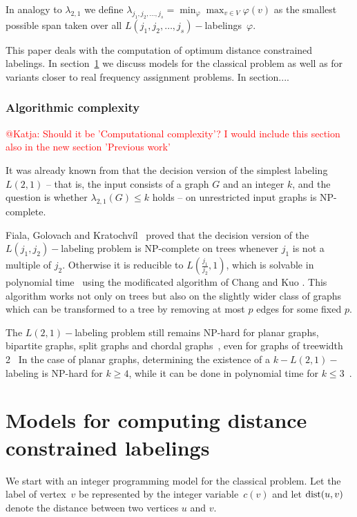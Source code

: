 \documentclass[smallextended]{svjour3}
\def\dist{\mathop{\rm dist}}
\newcommand\ToDo[1]{\textcolor{red}{#1}}
\begin{document}
In analogy to $\lambda_{2,1}$ we define $\lambda_{j_1,j_2,\ldots ,j_{s}}=\min_{\varphi}\max_{v\in V}\varphi(v)$ as the smallest possible span taken over all $L(j_1,j_2,\ldots ,j_{s})-$labelings~$\varphi$.

This paper deals with the computation of optimum distance constrained labelings.
In section~\ref{sec:IP} we discuss models for the classical problem as
well as for variants closer to real frequency assignment problems.
In section....

\subsubsection{Algorithmic complexity}
\ToDo{@Katja: Should it be 'Computational complexity'? I would include this section also in the new section 'Previous work'}

It was already known from \cite{GY92} that the decision version of the simplest labeling $L(2,1)$ -- that is, the input consists of a graph $G$ and an integer $k$, and the question is whether $\lambda_{2,1}(G)\leq k$ holds -- on unrestricted input graphs is NP-complete.

Fiala, Golovach and Kratochvíl~\cite{7} proved that the decision version of the $L(j_{1},j_{2})-$labeling problem is NP-complete on trees whenever $j_{1}$ is not a multiple of $j_{2}$. Otherwise it is reducible to $L(\frac{j_{1}}{j_{2}},1)$, which is solvable in polynomial time~\cite{8} using the modificated algorithm of Chang and Kuo \cite{9}. This algorithm works not only on trees but also on the slightly wider class of graphs which can be transformed to a tree by removing at most $p$ edges for some fixed $p$.

The $L(2,1)-$labeling problem still remains NP-hard for planar graphs, bipartite graphs, split graphs and chordal graphs~\cite{10}, even for graphs of treewidth 2~\cite{11} In the case of planar graphs, determining the existence of a $k-L(2,1)-$labeling is NP-hard for $k\geq4$, while it can be done in polynomial time for $k\leq3$~\cite{12}. 


\section{Models for computing distance constrained labelings}
\label{sec:IP}

We start with an integer programming model for the classical problem.
Let the label of vertex~$v$ be represented by the integer
variable~$c(v)$ and let $\dist(u,v)$ denote the distance between two vertices $u$ and $v$.
\end{document}
